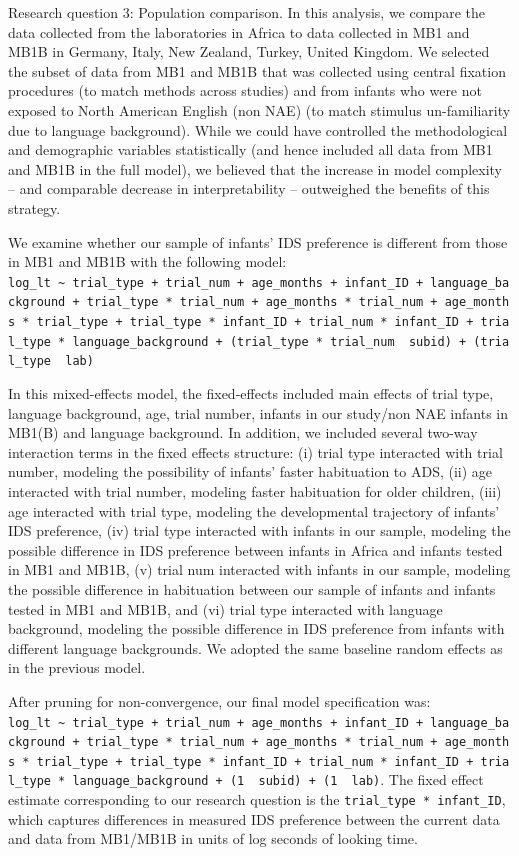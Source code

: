 \documentclass[
  ,man,floatsintext]{apa6}
\begin{document}
Research question 3: Population comparison. In this analysis, we compare the data collected from the laboratories in Africa to data collected in MB1 and MB1B in Germany, Italy, New Zealand, Turkey, United Kingdom. We selected the subset of data from MB1 and MB1B that was collected using central fixation procedures (to match methods across studies) and from infants who were not exposed to North American English (non NAE) (to match stimulus un-familiarity due to language background). While we could have controlled the methodological and demographic variables statistically (and hence included all data from MB1 and MB1B in the full model), we believed that the increase in model complexity -- and comparable decrease in interpretability -- outweighed the benefits of this strategy.

We examine whether our sample of infants' IDS preference is different from those in MB1 and MB1B with the following model:
\texttt{log\_lt\ \textasciitilde{}\ trial\_type\ +\ trial\_num\ +\ age\_months\ +\ infant\_ID\ +\ language\_background\ +\ trial\_type\ *\ trial\_num\ +\ age\_months\ *\ trial\_num\ +\ age\_months\ *\ trial\_type\ +\ trial\_type\ *\ infant\_ID\ +\ trial\_num\ *\ infant\_ID\ +\ trial\_type\ *\ language\_background\ +\ (trial\_type\ *\ trial\_num\ \textbar{}\ subid)\ +\ (trial\_type\ \textbar{}\ lab)}

In this mixed-effects model, the fixed-effects included main effects of trial type, language background, age, trial number, infants in our study/non NAE infants in MB1(B) and language background. In addition, we included several two-way interaction terms in the fixed effects structure: (i) trial type interacted with trial number, modeling the possibility of infants' faster habituation to ADS, (ii) age interacted with trial number, modeling faster habituation for older children, (iii) age interacted with trial type, modeling the developmental trajectory of infants' IDS preference, (iv) trial type interacted with infants in our sample, modeling the possible difference in IDS preference between infants in Africa and infants tested in MB1 and MB1B, (v) trial num interacted with infants in our sample, modeling the possible difference in habituation between our sample of infants and infants tested in MB1 and MB1B, and (vi) trial type interacted with language background, modeling the possible difference in IDS preference from infants with different language backgrounds. We adopted the same baseline random effects as in the previous model.

After pruning for non-convergence, our final model specification was: \texttt{log\_lt\ \textasciitilde{}\ trial\_type\ +\ trial\_num\ +\ age\_months\ +\ infant\_ID\ +\ language\_background\ +\ trial\_type\ *\ trial\_num\ +\ age\_months\ *\ trial\_num\ +\ age\_months\ *\ trial\_type\ +\ trial\_type\ *\ infant\_ID\ +\ trial\_num\ *\ infant\_ID\ +\ trial\_type\ *\ language\_background\ +\ (1\ \textbar{}\ subid)\ +\ (1\ \textbar{}\ lab)}. The fixed effect estimate corresponding to our research question is the \texttt{trial\_type\ *\ infant\_ID}, which captures differences in measured IDS preference between the current data and data from MB1/MB1B in units of log seconds of looking time.
\end{document}
